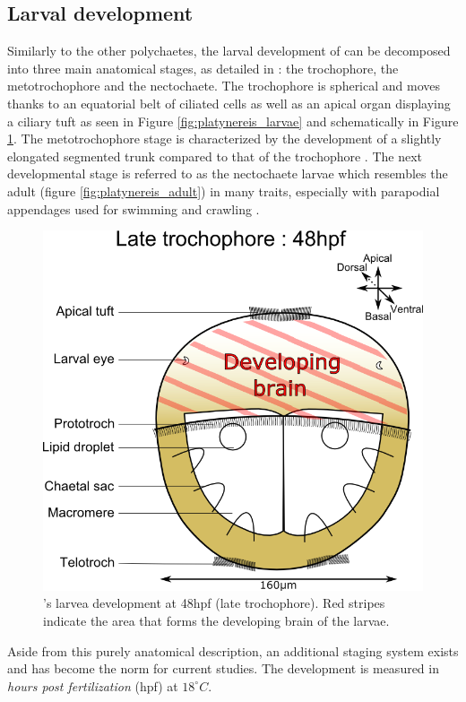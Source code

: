  
     \subsection{Larval development}
    Similarly to the other polychaetes, the larval development of \platy{} can be decomposed into three main anatomical stages, as detailed in \cite{hauenschild69}: the trochophore, the metotrochophore and the nectochaete. The trochophore is spherical and moves thanks to an equatorial belt of ciliated cells as well as an apical organ displaying a ciliary tuft \cite{rouse99,nielsen04} as seen in Figure \ref{fig:platynereis_larvae} and schematically in Figure \ref{fig:platynereis_larvae_scheme}. The metotrochophore stage is characterized by the development of a slightly elongated segmented trunk compared to that of the trochophore \cite{hacker98}. The next developmental stage is referred to as the nectochaete larvae which resembles the adult (figure \ref{fig:platynereis_adult}) in many traits, especially with parapodial appendages used for swimming and crawling \cite{hacker98}.\\
    
\begin{figure}[bth]
\begin{center}
  \includegraphics[width=0.6\linewidth]{gfx/chapter1/larvae48hpf.png}
\end{center}
  \caption{\platyfull{}'s larvea development at 48hpf (late trochophore). Red stripes indicate the area that forms the developing brain of the larvae.}
  \label{fig:platynereis_larvae_scheme}
\end{figure}
    
    Aside from this purely anatomical description, an additional staging system exists and has become the norm for current studies. The development is measured in \textit{hours post fertilization} (hpf) at $18^{\circ}C$.
    
